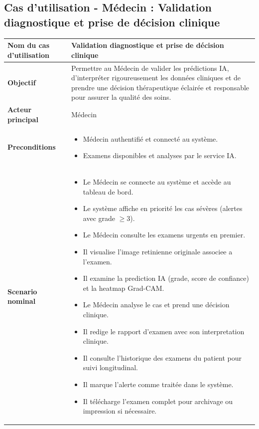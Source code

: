\subsection{Cas d'utilisation - Médecin : Validation diagnostique et prise de décision clinique}
\begin{table}[H]
\centering
\renewcommand{\arraystretch}{1.3}
\begin{tabular}{|p{5cm}|p{10cm}|}
\hline
\textbf{Nom du cas d'utilisation} & Validation diagnostique et prise de décision clinique \\ \hline

\textbf{Objectif} & Permettre au Médecin de valider les prédictions IA, d'interpréter rigoureusement les données cliniques et de prendre une décision thérapeutique éclairée et responsable pour assurer la qualité des soins. \\ \hline

\textbf{Acteur principal} & Médecin \\ \hline

\textbf{Preconditions} & 
\begin{itemize}
\item Médecin authentifié et connecté au système.
\item Examens disponibles et analyses par le service IA.
\end{itemize} \\ \hline

\textbf{Scenario nominal} &
\begin{itemize}
\item Le Médecin se connecte au système et accède au tableau de bord.
\item Le système affiche en priorité les cas sévères (alertes avec grade $\geq 3$).
\item Le Médecin consulte les examens urgents en premier.
\item Il visualise l'image retinienne originale associee a l'examen.
\item Il examine la prediction IA (grade, score de confiance) et la heatmap Grad-CAM.
\item Le Médecin analyse le cas et prend une décision clinique.
\item Il redige le rapport d'examen avec son interpretation clinique.
\item Il consulte l'historique des examens du patient pour suivi longitudinal.
\item Il marque l'alerte comme traitée dans le système.
\item Il télécharge l'examen complet pour archivage ou impression si nécessaire.
\end{itemize} \\ \hline


\end{tabular}
\end{table}

